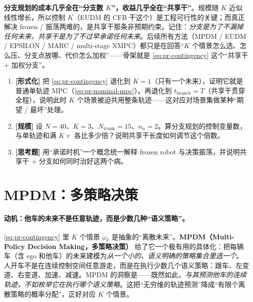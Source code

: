 \begin{insight}
\textbf{分支规划的成本几乎全在“分支数 $K$”，收益几乎全在“共享干”}。规模随 $K$ 近似线性增长，所以控制 $K$（EUDM 的 CFB 干这个）是工程可行性的关键；而真正解决 frozen / 振荡两难的，是共享干那条非预期约束。记住：\emph{分支是为了不漏掉任何未来，共享干是为了不过早承诺任何未来}。后续所有方法（MPDM / EUDM / EPSILON / MARC / multi-stage NMPC）都只是在回答“$K$ 个情景怎么选、怎么压、分支点放哪、代价怎么加权”——骨架就是 \cref{eq:pr-contingency} 这个“共享干 + 加权分支”。
\end{insight}

\begin{practice}
\begin{enumerate}
  \item \textbf{[形式化]} 把 \cref{eq:pr-contingency} 退化到 $K=1$（只有一个未来），证明它就是普通单轨迹 MPC（\cref{eq:pr-nominal-mpc}）。再退化到 $t_{\mathrm{branch}}=T$（共享干贯穿全程），说明此时 $K$ 个场景被迫共用整条轨迹——这对应对场景集做某种“期望 / 最坏”处理。
  \item \textbf{[规模]} 设 $N=40$、$K=3$、$N_{\mathrm{trunk}}=15$、$n_u=2$。算分支规划的控制变量数，与单轨迹和满 $K\times$ 各比多少倍？说明共享干长度如何调节这个倍数。
  \item \textbf{[思考题]} 用“承诺时机”一个概念统一解释 frozen robot 与决策振荡，并说明共享干 + 分支如何同时治好这两个病。
\end{enumerate}
\end{practice}

\section{MPDM：多策略决策}
\label{sec:pr-mpdm}

\paragraph{动机：他车的未来不是任意轨迹，而是少数几种“语义策略”。}
\cref{eq:pr-contingency} 里 $K$ 个情景 $\omega_k$ 是抽象的“离散未来”。\textbf{MPDM（Multi-Policy Decision Making，多策略决策）}\cite{cunningham2015mpdm} 给了它一个极有用的具体化：把每辆车（含 ego 和他车）的未来建模为\emph{从一个小的、语义明确的策略集合里选一个}。人开车不是在连续控制空间任意游走，而是在执行少数几个语义策略：跟车、左变道、右变道、加速、减速。MPDM 的洞察是——既然如此，\emph{与其预测他车的连续轨迹，不如枚举它在执行哪个语义策略}。这把“无穷维的轨迹预测”降成“有限个离散策略的概率分配”，正好对应 $K$ 个情景。

